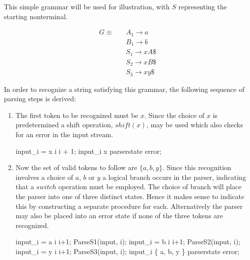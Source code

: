 \documentclass[a4paper,11pt]{article}
\begin{document}
This simple grammar will be used for illustration, with $S$ representing the starting nonterminal.

\begin{align*}
G \equiv \quad & A_1 \rightarrow a\\
               & B_1 \rightarrow b\\
               & S_1 \rightarrow x A \$\\
               & S_2 \rightarrow x B \$\\
               & S_3 \rightarrow x y \$
\end{align*}

In order to recognize a string satisfying this grammar, the following sequence of parsing steps is derived:
\begin{enumerate}
\item The first token to be recognized must be $x$. Since the choice of $x$ is predetermined a shift operation, $shift(x)$, may be used which also checks for an error in the input stream.
\begin{center}
\begin{gcl}
\IF input_i = x \rightarrow i \becomes i + 1;
\BAR input_i \neq x \rightarrow parserstate \becomes error;
\FI
\end{gcl}
\end{center}

\item Now the set of valid tokens to follow are $\{ a, b, y \}$. 
Since this recognition involves a choice of $a$, $b$ or $y$ a logical branch occurs in the parser, indicating that a $switch$ operation must be employed.
The choice of branch will place the parser into one of three distinct states.
Hence it makes sense to indicate this by constructing a separate procedure for each. 
Alternatively the parser may also be placed into an error state if none of the three tokens are recognized.
\begin{center}
\begin{gcl}
\IF input_i = a \rightarrow 
                \qquad i \becomes i+1; 
                \qquad ParseS1(input, i);
\BAR input_i = b \rightarrow 
                \qquad i \becomes i+1;
                \qquad ParseS2(input, i);
\BAR input_i = y \rightarrow 
                \qquad i \becomes i+1; 
                \qquad ParseS3(input, i);
\BAR input_i \notin \{ a, b, y \} \rightarrow 
                \qquad parserstate \becomes error;
\FI
\end{gcl}
\end{center}


\end{enumerate}
\end{document}
